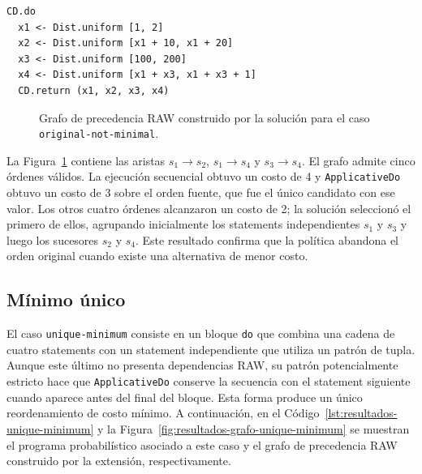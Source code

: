 \begin{lstlisting}[style=haskell,caption={Programa probabilístico asociado al caso \texttt{original-not-minimal}.},label={lst:resultados-original-not-minimal}]
CD.do
  x1 <- Dist.uniform [1, 2]
  x2 <- Dist.uniform [x1 + 10, x1 + 20]
  x3 <- Dist.uniform [100, 200]
  x4 <- Dist.uniform [x1 + x3, x1 + x3 + 1]
  CD.return (x1, x2, x3, x4)
\end{lstlisting}

\begin{figure}[ht]
\centering
\begingroup
\setgraphnodesize{1.7cm}{1.0cm}{8pt}
\begin{PrecedenceGraph}[node distance=0.4cm and 0.45cm]
\end{PrecedenceGraph}
\endgroup
\caption[Grafo RAW del caso \texttt{original-not-minimal}.]{Grafo de precedencia RAW construido por la solución para el caso \texttt{original-not-minimal}.}
\label{fig:resultados-grafo-original-not-minimal}
\end{figure}

La Figura~\ref{fig:resultados-grafo-original-not-minimal} contiene las aristas $s_1\to s_2$, $s_1\to s_4$ y $s_3\to s_4$. El grafo admite cinco órdenes válidos. La ejecución secuencial obtuvo un costo de 4 y \texttt{ApplicativeDo} obtuvo un costo de 3 sobre el orden fuente, que fue el único candidato con ese valor. Los otros cuatro órdenes alcanzaron un costo de 2; la solución seleccionó el primero de ellos, agrupando inicialmente los statements independientes $s_1$ y $s_3$ y luego los sucesores $s_2$ y $s_4$. Este resultado confirma que la política abandona el orden original cuando existe una alternativa de menor costo.

\subsection{Mínimo único}

El caso \texttt{unique-minimum} consiste en un bloque \texttt{do} que combina una cadena de cuatro statements con un statement independiente que utiliza un patrón de tupla. Aunque este último no presenta dependencias RAW, su patrón potencialmente estricto hace que \texttt{ApplicativeDo} conserve la secuencia con el statement siguiente cuando aparece antes del final del bloque. Esta forma produce un único reordenamiento de costo mínimo. A continuación, en el Código~\ref{lst:resultados-unique-minimum} y la Figura~\ref{fig:resultados-grafo-unique-minimum} se muestran el programa probabilístico asociado a este caso y el grafo de precedencia RAW construido por la extensión, respectivamente.

